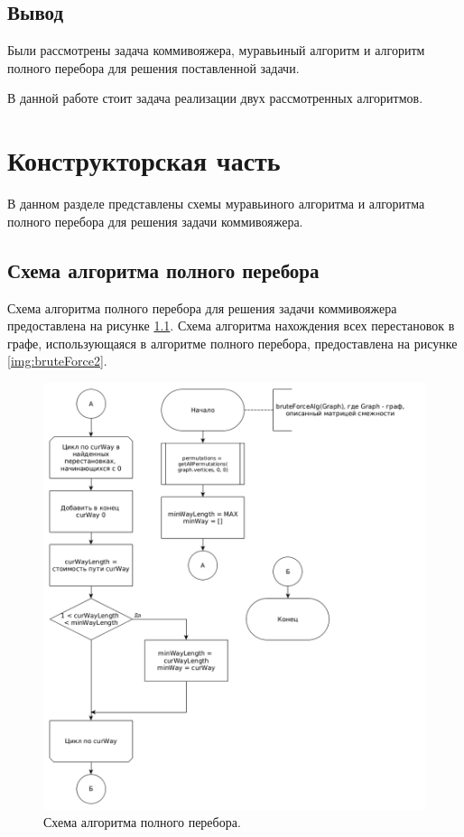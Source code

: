 \documentclass[12pt]{report}
\begin{document}
\section*{Вывод}
Были рассмотрены задача коммивояжера, муравьиный алгоритм и алгоритм полного перебора для решения поставленной задачи.

В данной работе стоит задача реализации двух рассмотренных алгоритмов.

\chapter{Конструкторская часть}
В данном разделе представлены схемы муравьиного алгоритма и алгоритма полного перебора для решения задачи коммивояжера.
\section{Схема алгоритма полного перебора}
Схема алгоритма полного перебора для решения задачи коммивояжера предоставлена на рисунке \ref{img:bruteForce}. Схема алгоритма нахождения всех перестановок в графе, использующаяся в алгоритме полного перебора, предоставлена на рисунке \ref{img:bruteForce2}.

\begin{figure}
\begin{center}
\includegraphics[scale=0.4]{inc/img/bruteForce.png}
\captionsetup{justification=centering}
	\caption{Схема алгоритма полного перебора.}
	\label{img:bruteForce}	
\end{center}
\end{figure}
\end{document}
